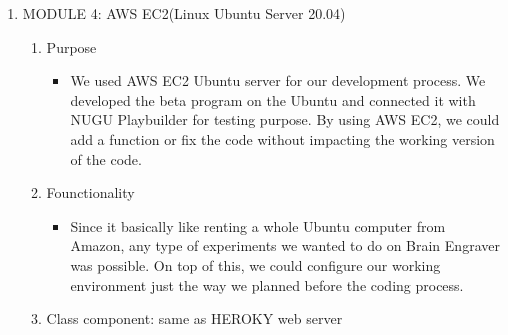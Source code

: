 \documentclass[conference]{IEEEtran}
\begin{document}
\begin{enumerate}
\begin{enumerate}
\begin{enumerate}
                \end{enumerate}
            \end{enumerate}
        \item MODULE 4: AWS EC2(Linux Ubuntu Server 20.04)
            \begin{enumerate}
                \item Purpose
                    \begin{itemize}
                        \item We used AWS EC2 Ubuntu server for our development process. We developed the beta program on the Ubuntu and connected it with NUGU Playbuilder for testing purpose. By using AWS EC2, we could add a function or fix the code without impacting the working version of the code.
                    \end{itemize}
                \item Founctionality
                    \begin{itemize}
                        \item Since it basically like renting a whole Ubuntu computer from Amazon, any type of experiments we wanted to do on Brain Engraver was possible. On top of this, we could configure our working environment just the way we planned before the coding process.
                    \end{itemize}
                \item Class component: same as HEROKY web server
            \end{enumerate}
        
        
    \end{enumerate}
    
\end{document}
